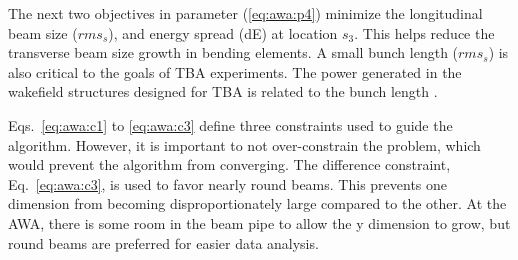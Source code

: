 The next two objectives in parameter (\ref{eq:awa:p4}) minimize the 
longitudinal beam size ($rms_s$), and energy spread (dE) at location $s_3$. 
This helps reduce the transverse beam size growth in bending elements.
A small bunch length ($rms_s$) is also critical to the goals of 
TBA experiments. The power generated in the wakefield structures 
designed for TBA is related to the bunch length \cite{JING201872,PETSeq}.

Eqs.~\ref{eq:awa:c1} to \ref{eq:awa:c3} 
define three constraints used to guide the algorithm.
However, it is important to not over-constrain the problem, which would prevent
the algorithm from converging.
The difference constraint, Eq.~\ref{eq:awa:c3}, is used to favor nearly round beams.
This prevents one dimension from becoming disproportionately large compared to the other.
At the AWA, there is some room in the beam pipe to allow the y dimension to grow, but round beams 
are preferred for easier data analysis.

